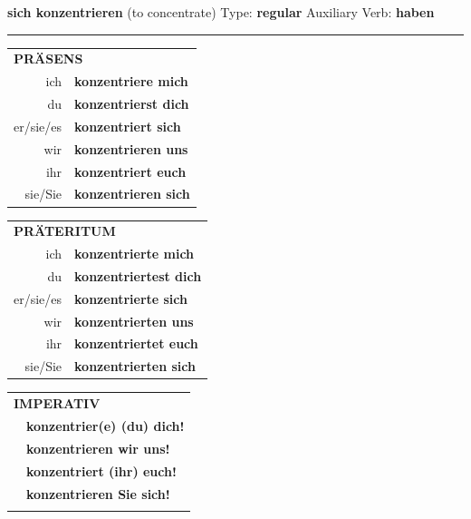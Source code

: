 \documentclass[10pt,a4paper]{revtex4-2}
\begin{document}
\begin{verbbox}
        {\Large \bf sich konzentrieren} (to concentrate) \hfill Type: \textbf{regular} \hfill Auxiliary Verb: \textbf{haben} 
    
       \vspace{5pt}

    \hrule
    
    \vspace{5pt}

  \begin{tabular}{rl}
     \multicolumn{2}{l}{\textbf{PRÄSENS} }\\
    ich & \textbf{konzentriere mich}\\
    du & \textbf{konzentrierst dich}\\
    er/sie/es & \textbf{konzentriert sich}\\
    wir & \textbf{konzentrieren uns}\\
    ihr & \textbf{konzentriert euch}\\
    sie/Sie & \textbf{konzentrieren sich}\\
  \end{tabular}
  \hfill
     \begin{tabular}{rl}
    \multicolumn{2}{l}{\textbf{PRÄTERITUM} }\\
    ich & \textbf{konzentrierte mich}\\
    du & \textbf{konzentriertest dich}\\
    er/sie/es & \textbf{konzentrierte sich}\\
    wir & \textbf{konzentrierten uns}\\
    ihr & \textbf{konzentriertet euch}\\
    sie/Sie & \textbf{konzentrierten sich}\\
  \end{tabular}
  \hfill
  \begin{tabular}{rl}
     \multicolumn{2}{l}{\textbf{IMPERATIV} }\\
   & \textbf{konzentrier(e) (du) dich!}\\
   & \textbf{konzentrieren wir uns!}\\
   & \textbf{konzentriert (ihr) euch!}\\
   & \textbf{konzentrieren Sie sich!}\\
   & \vspace{10pt}
  \end{tabular}


\end{verbbox}
\end{document}

